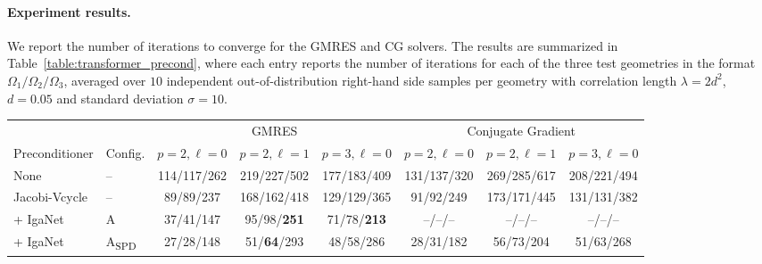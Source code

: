 \documentclass{article}
\newcommand{\reflevel}{\ell} %
\theoremstyle{plain}
\numberwithin{equation}{section}
\begin{document}
\paragraph{Experiment results.} We report the number of iterations to converge for the GMRES and CG solvers. The results are summarized in Table~\ref{table:transformer_precond}, where each entry reports the number of iterations for each of the three test geometries in the format $\Omega_1/\Omega_2/\Omega_3$, averaged over   $10$ independent out-of-distribution right-hand side samples per geometry with correlation length $\lambda = 2d^2$, $d=0.05$ and standard deviation $\sigma = 10$.
\begin{table}[!ht]
    \centering
    \small
    \setlength{\tabcolsep}{4pt}
    \begin{tabular}{llcccccc}
        \toprule
        & & \multicolumn{3}{c}{GMRES} & \multicolumn{3}{c}{Conjugate Gradient} \\
        \cmidrule(lr){3-5}  \cmidrule(lr){6-8}
        Preconditioner & Config.  & $p=2, \reflevel=0$ & $p=2, \reflevel=1$ & $p=3, \reflevel=0$  & $p=2, \reflevel=0$ & $p=2, \reflevel=1$ & $p=3, \reflevel=0$                 \\
        \midrule
        None           & --                  & 114/117/262                         & 219/227/502                 & 177/183/409  
                                             & 131/137/320                         & 269/285/617                 & 208/221/494  \\
        \midrule
        Jacobi-Vcycle  & --                  & 89/89/237                           & 168/162/418                 & 129/129/365                          
                                             & 91/92/249                           & 173/171/445                 & 131/131/382                           \\
        + IgaNet       & A                   & 37/41/147                           & 95/98/\textbf{251}          & 71/78/\textbf{213}                   
                                             & --/--/--                            & --/--/--                    & --/--/--                             \\
        + IgaNet       & A\textsubscript{SPD}& 27/28/148                           & 51/\textbf{64}/293          & 48/58/286          
                                             & 28/31/182                           & 56/73/204                   & 51/63/268                             \\

\end{tabular}
\end{table}
\end{document}
